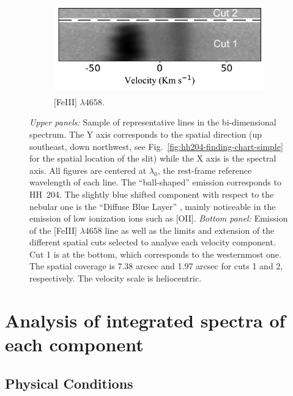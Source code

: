 \documentclass[twocolumn]{aastex63}
\newcommand{\eduardo}[1]{{\color{teal}E: #1}}
\newcommand{\cesar}[1]{{\color{red}C: #1}}
\begin{document}
\begin{figure}
\begin{subfigure}{10cm}
\centering\includegraphics[height=4cm, width=\columnwidth]{2D_4658_cuts.pdf}
\caption{[Fe\thinspace III] $\lambda 4658$.} 

\end{subfigure}
\caption{\textit{Upper panels:} Sample of representative lines in the bi-dimensional spectrum. The Y axis corresponds to the spatial direction (up southeast, down northwest, see Fig.~\ref{fig:hh204-finding-chart-simple} for the spatial location of the slit) while the X axis is the spectral axis. All figures are centered at $\lambda_0$, the rest-frame reference wavelength of each line. The ``ball-shaped'' emission corresponds to HH~204. The slightly blue shifted component with respect to the nebular one is the ``Diffuse Blue Layer'' \citep{Deharveng73,garciadiaz07}, mainly noticeable in the emission of low ionization ions such as [O\thinspace II]. \textit{Bottom panel:} Emission of the [Fe\thinspace III] $\lambda 4658$ line as well as the limits and extension of the different spatial cuts selected to analyse each velocity component. Cut 1 is at the bottom, which corresponds to the westernmost one. The spatial coverage is 7.38 arcsec and 1.97 arcsec for cuts 1 and 2, respectively. The velocity scale is heliocentric.}
\label{fig:cuts}
\end{figure}


\section{Analysis of integrated spectra of each component}
\label{sec:gen_analysis}


\subsection{Physical Conditions}
\label{subsec:physical_cond}
\end{document}
